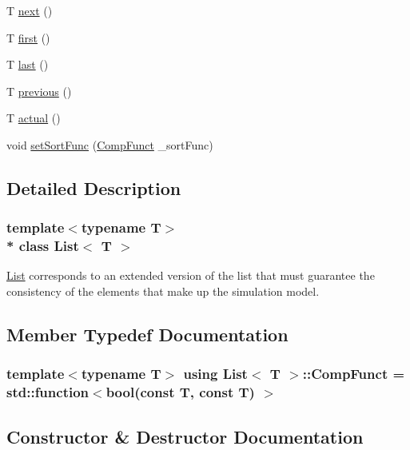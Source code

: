 \begin{DoxyCompactItemize}
\item 
T \hyperlink{class_list_a2dce655743c2b6c7cc7c9b6034badf78}{next} ()
\item 
T \hyperlink{class_list_a42761114ff6730da1402089d4bd3f795}{first} ()
\item 
T \hyperlink{class_list_a9944c09ee1bd6390bbf017be5c858063}{last} ()
\item 
T \hyperlink{class_list_ab43f87321c901694807e6c9315a72cd0}{previous} ()
\item 
T \hyperlink{class_list_a58474bac3aa3d1ef7208aa06a3789d57}{actual} ()
\item 
void \hyperlink{class_list_a31a37746c0d960f2f2bb4071b2735c5e}{set\+Sort\+Func} (\hyperlink{class_list_a9e9db1a7f0275e9b4ca5a46e3d0874ff}{Comp\+Funct} \+\_\+sort\+Func)
\end{DoxyCompactItemize}


\subsection{Detailed Description}
\subsubsection*{template$<$typename T$>$\\*
class List$<$ T $>$}

\hyperlink{class_list}{List} corresponds to an extended version of the list that must guarantee the consistency of the elements that make up the simulation model. 

\subsection{Member Typedef Documentation}
\subsubsection[{\texorpdfstring{Comp\+Funct}{CompFunct}}]{\setlength{\rightskip}{0pt plus 5cm}template$<$typename T$>$ using {\bf List}$<$ T $>$\+::{\bf Comp\+Funct} =  std\+::function$<$bool(const T, const T) $>$}\hypertarget{class_list_a9e9db1a7f0275e9b4ca5a46e3d0874ff}{}\label{class_list_a9e9db1a7f0275e9b4ca5a46e3d0874ff}


\subsection{Constructor \& Destructor Documentation}
